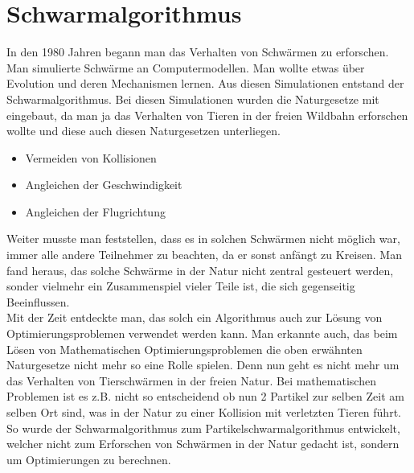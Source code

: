 \section{Schwarmalgorithmus}

In den 1980 Jahren begann man das Verhalten von Schwärmen zu erforschen. Man simulierte Schwärme an Computermodellen. Man wollte etwas über Evolution und deren Mechanismen lernen. Aus diesen Simulationen entstand der Schwarmalgorithmus.
Bei diesen Simulationen wurden die Naturgesetze mit eingebaut, da man ja das Verhalten von Tieren in der freien Wildbahn erforschen wollte und diese auch diesen Naturgesetzen unterliegen.

\begin{itemize}
\item Vermeiden von Kollisionen 
\item Angleichen der Geschwindigkeit
\item Angleichen der Flugrichtung
\end{itemize}

Weiter musste man feststellen, dass es in solchen Schwärmen nicht möglich war, immer alle andere Teilnehmer zu beachten, da er sonst anfängt zu Kreisen. Man fand heraus, das solche Schwärme in der Natur nicht zentral gesteuert werden, sonder vielmehr ein Zusammenspiel vieler Teile ist, die sich gegenseitig Beeinflussen.\\
Mit der Zeit entdeckte man, das solch ein Algorithmus auch zur Lösung von Optimierungsproblemen verwendet werden kann.
Man erkannte auch, das beim Lösen von Mathematischen Optimierungsproblemen die oben erwähnten Naturgesetze nicht mehr so eine Rolle spielen. Denn nun geht es nicht mehr um das Verhalten von Tierschwärmen in der freien Natur. Bei mathematischen Problemen ist es z.B. nicht so entscheidend ob nun 2 Partikel zur selben Zeit am selben Ort sind, was in der Natur zu einer Kollision mit verletzten Tieren führt. So wurde der Schwarmalgorithmus zum Partikelschwarmalgorithmus entwickelt, welcher nicht zum Erforschen von Schwärmen in der Natur gedacht ist, sondern um Optimierungen zu berechnen.